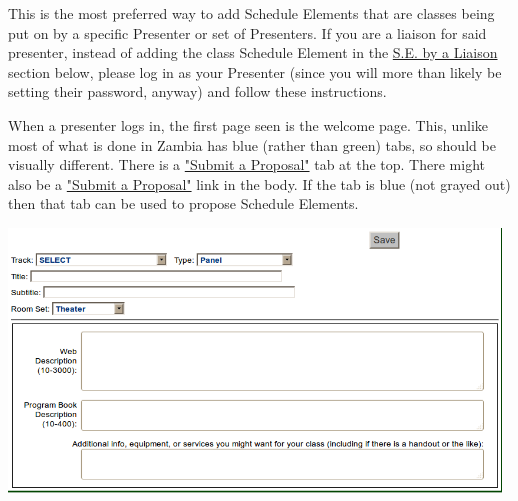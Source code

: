 \documentclass[captions=tablesignature]{scrartcl}
\begin{document}
This is the most preferred way to add Schedule Elements that are
classes being put on by a specific Presenter or set of Presenters.
If you are a liaison for said presenter, instead of adding the
class Schedule Element in the \hyperref[sec-5-3]{S.E. by a Liaison} section below,
please log in as your Presenter (since you will more than likely be
setting their password, anyway) and follow these instructions.

When a presenter logs in, the first page seen is the welcome page.
This, unlike most of what is done in Zambia has blue (rather than
green) tabs, so should be visually different.  There is a
\href{../webpages/BrainstormCreateSession.php}{"Submit a Proposal"} tab at the top.  There might also be a 
\href{../webpages/BrainstormCreateSession.php}{"Submit a Proposal"} link in the body.  If the tab is blue (not
grayed out) then that tab can be used to propose Schedule Elements.

\includegraphics[width=0.98\textwidth]{./Images/Propose_Session.png}
\end{document}
